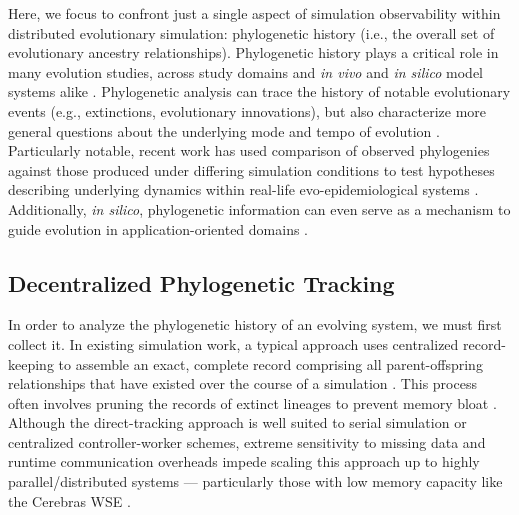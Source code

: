 Here, we focus to confront just a single aspect of simulation observability within distributed evolutionary simulation: phylogenetic history (i.e., the overall set of evolutionary ancestry relationships).
Phylogenetic history plays a critical role in many evolution studies, across study domains and \textit{in vivo} and \textit{in silico} model systems alike \citep{faithConservationEvaluationPhylogenetic1992, STAMATAKIS2005phylogenetics, frenchHostPhylogenyShapes2023,kim2006discovery,TODOCITESOMESIMULATIONPAPERS}.
Phylogenetic analysis can trace the history of notable evolutionary events (e.g., extinctions, evolutionary innovations), but also characterize more general questions about the underlying mode and tempo of evolution \citep{moreno2023toward,hernandez2022can,shahbandegan2022untangling,lewinsohnStatedependentEvolutionaryModels2023a}.
Particularly notable, recent work has used comparison of observed phylogenies against those produced under differing simulation conditions to test hypotheses describing underlying dynamics within real-life evo-epidemiological systems \citep{giardina2017inference,voznica2022deep}.
Additionally, \textit{in silico}, phylogenetic information can even serve as a mechanism to guide evolution in application-oriented domains \citep{lalejini2024phylogeny,lalejini2024runtime,murphy2008simple,burke2003increased}.

\subsection{Decentralized Phylogenetic Tracking}

In order to analyze the phylogenetic history of an evolving system, we must first collect it.
In existing simulation work, a typical approach uses centralized record-keeping to assemble an exact, complete record comprising all parent-offspring relationships that have existed over the course of a simulation \citep{phylotrackandeverythingphylotrackcitedTODO}.
This process often involves pruning the records of extinct lineages to prevent memory bloat \citep{TODOCITEPREPRINT}.
Although the direct-tracking approach is well suited to serial simulation or centralized controller-worker schemes, extreme sensitivity to missing data and runtime communication overheads impede scaling this approach up to highly parallel/distributed systems --- particularly those with low memory capacity like the Cerebras WSE \citep{moreno2024analysis}.

